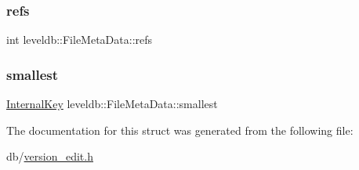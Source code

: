 \subsubsection{\texorpdfstring{refs}{refs}}
{\footnotesize\ttfamily int leveldb\+::\+File\+Meta\+Data\+::refs}

\mbox{\label{structleveldb_1_1_file_meta_data_a9e5e5c149495aede836ac637cd89269f}} 
\subsubsection{\texorpdfstring{smallest}{smallest}}
{\footnotesize\ttfamily \mbox{\hyperlink{classleveldb_1_1_internal_key}{Internal\+Key}} leveldb\+::\+File\+Meta\+Data\+::smallest}



The documentation for this struct was generated from the following file\+:\begin{DoxyCompactItemize}
\item 
db/\mbox{\hyperlink{version__edit_8h}{version\+\_\+edit.\+h}}\end{DoxyCompactItemize}
